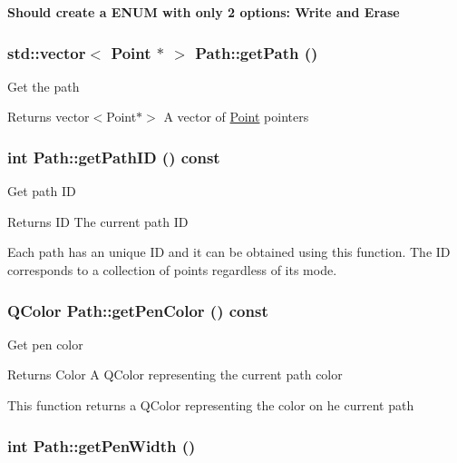 {\bfseries Should create a ENUM with only 2 options: Write and Erase} \hypertarget{classPath_a0ef674b3f5c9c7d2f2b5b210fa54d7e9}{
\subsubsection[{getPath}]{\setlength{\rightskip}{0pt plus 5cm}std::vector$<$ {\bf Point} $\ast$ $>$ Path::getPath ()}}
\label{classPath_a0ef674b3f5c9c7d2f2b5b210fa54d7e9}
Get the path \begin{DoxyReturn}{Returns}
vector$<$Point$\ast$$>$ A vector of \hyperlink{classPoint}{Point} pointers 
\end{DoxyReturn}
\hypertarget{classPath_ac249bd9daa1240c74ad2f3d57dd94d28}{
\subsubsection[{getPathID}]{\setlength{\rightskip}{0pt plus 5cm}int Path::getPathID () const}}
\label{classPath_ac249bd9daa1240c74ad2f3d57dd94d28}
Get path ID \begin{DoxyReturn}{Returns}
ID The current path ID
\end{DoxyReturn}
Each path has an unique ID and it can be obtained using this function. The ID corresponds to a collection of points regardless of its mode. \hypertarget{classPath_ab1e4f5182ce9a25cd2efddc0d0e0c3da}{
\subsubsection[{getPenColor}]{\setlength{\rightskip}{0pt plus 5cm}QColor Path::getPenColor () const}}
\label{classPath_ab1e4f5182ce9a25cd2efddc0d0e0c3da}
Get pen color \begin{DoxyReturn}{Returns}
Color A QColor representing the current path color
\end{DoxyReturn}
This function returns a QColor representing the color on he current path \hypertarget{classPath_a148b0baa2335d7e6f8a8d608c4ed5be7}{
\subsubsection[{getPenWidth}]{\setlength{\rightskip}{0pt plus 5cm}int Path::getPenWidth ()}}
